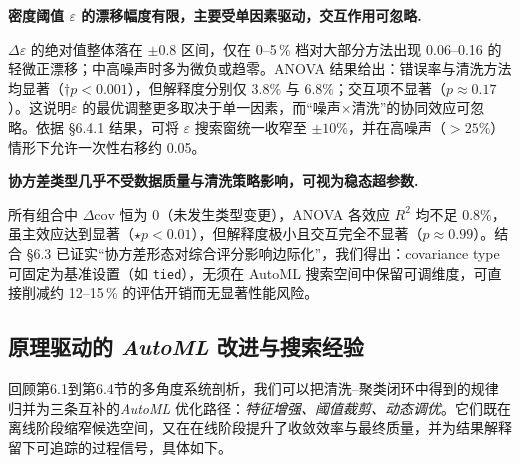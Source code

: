 \documentclass[10pt]{article} %
\numberwithin{equation}{section}
\begin{document}
\medskip
\noindent%
\textbf{密度阈值 \(\varepsilon\) 的漂移幅度有限，主要受单因素驱动，交互作用可忽略.}\; 

\(\Delta\varepsilon\) 的绝对值整体落在 \(\pm0.8\) 区间，仅在 0–5\,\% 档对大部分方法出现 0.06–0.16 的轻微正漂移；中高噪声时多为微负或趋零。ANOVA 结果给出：错误率与清洗方法均显著（\(\dagger p<0.001\)），但解释度分别仅 \(3.8\%\) 与 \(6.8\%\)；交互项不显著（\(p\approx0.17\)）。\textcolor[rgb]{0.00,0.07,1.00}{这说明\(\varepsilon\) 的最优调整更多取决于单一因素，而“噪声\(\times\)清洗”的协同效应可忽略。依据 §6.4.1 结果，可将  \(\varepsilon\) 搜索窗统一收窄至 \(\pm10\%\)，并在高噪声（\(>25\%\)）情形下允许一次性右移约 0.05。  }

\medskip
\noindent%
\textbf{协方差类型几乎不受数据质量与清洗策略影响，可视为稳态超参数.}\;

所有组合中 \(\Delta\text{cov}\) 恒为 0（未发生类型变更），ANOVA 各效应 \(R^{2}\) 均不足 \(0.8\%\)，虽主效应达到显著（\(\star p<0.01\)），但解释度极小且交互完全不显著（\(p\approx0.99\)）。结合 §6.3 已证实“协方差形态对综合评分影响边际化”，我们得出：\textcolor[rgb]{0.00,0.07,1.00}{covariance type 可固定为基准设置（如 \texttt{tied}），无须在 AutoML 搜索空间中保留可调维度，可直接削减约 12–15\,\% 的评估开销而无显著性能风险。 }

\subsection{原理驱动的 \textit{AutoML} 改进与搜索经验}
\label{sec:6.5}

回顾第6.1到第6.4节的多角度系统剖析，我们可以把清洗–聚类闭环中得到的规律归并为三条互补的\textit{AutoML} 优化路径：\emph{特征增强、阈值裁剪、动态调优}。它们既在离线阶段缩窄候选空间，又在在线阶段提升了收敛效率与最终质量，并为结果解释留下可追踪的过程信号，具体如下。
\end{document}
